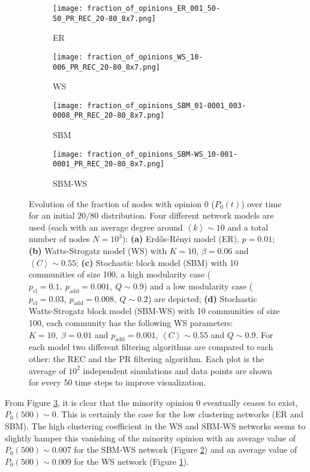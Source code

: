 \documentclass[11 pt , letterpaper , twoside , openright]{book}
\begin{document}
\begin{figure}[H]
  \begin{subfigure}[b]{0.49\textwidth}
  	\texttt{[image: fraction\_of\_opinions\_ER\_001\_50-50\_PR\_REC\_20-80\_8x7.png]}
    \caption{ER}
  \end{subfigure}
  \begin{subfigure}[b]{0.49\textwidth}
  	\texttt{[image: fraction\_of\_opinions\_WS\_10-006\_PR\_REC\_20-80\_8x7.png]}
    \caption{WS}
    \label{ws_20-80_op}
  \end{subfigure}
  \begin{subfigure}[b]{0.49\textwidth}
    \texttt{[image: fraction\_of\_opinions\_SBM\_01-0001\_003-0008\_PR\_REC\_20-80\_8x7.png]}
    \caption{SBM}
  \end{subfigure}
  \begin{subfigure}[b]{0.49\textwidth}
    \texttt{[image: fraction\_of\_opinions\_SBM-WS\_10-001-0001\_PR\_REC\_20-80\_8x7.png]}
    \caption{SBM-WS}
    \label{sbm-ws_20-80_op}
  \end{subfigure}
  \captionsetup{format=plain}
  \caption[Evolution of the fraction of nodes with opinion 0 ($P_0(t)$) over time for an initial $20/80$ opinion distribution]{Evolution of the fraction of nodes with opinion 0 ($P_0(t)$) over time for an initial $20/80$ distribution. Four different network models are used (each with an average degree around $\left<k\right> \sim 10$ and a total number of nodes $N = 10^3$): \textbf{(a)} Erd\H{o}s-R\'{e}nyi model (ER), $p=0.01$; \textbf{(b)} Watts-Strogatz model (WS) with $K = 10$, $\beta = 0.06$ and $\left<C\right> \sim 0.55$; \textbf{(c)} Stochastic block model (SBM) with 10 communities of size 100, a high modularity case ($p_{\text{cl}} = 0.1,\ p_{\text{add}} = 0.001,\ Q \sim 0.9$) and a low modularity case ($p_{\text{cl}} = 0.03,\ p_{\text{add}} = 0.008,\ Q \sim 0.2$) are depicted; \textbf{(d)} Stochastic Watts-Strogatz block model (SBM-WS) with 10 communities of size 100, each community has the following WS parameters: $K = 10,\ \beta = 0.01$ and $p_{\text{add}} = 0.001$, $\left<C\right> \sim 0.55$ and $Q \sim 0.9$. For each model two different filtering algorithms are compared to each other: the REC and the PR filtering algorithm. Each plot is the average of $10^2$ independent simulations and data points are shown for every 50 time steps to improve visualization.}
\label{ev_op_20_80}
\end{figure}
\noindent
From Figure \ref{ev_op_20_80}, it is clear that the minority opinion 0 eventually ceases to exist, $P_0(500) \sim 0$. This is certainly the case for the low clustering networks (ER and SBM). The high clustering coefficient in the WS and SBM-WS networks seems to slightly hamper this vanishing of the minority opinion with an average value of $P_0(500) \sim 0.007$ for the SBM-WS network (Figure \ref{sbm-ws_20-80_op}) and an average value of $P_0(500) \sim 0.009$ for the WS network (Figure \ref{ws_20-80_op}).\\ 
\end{document}
